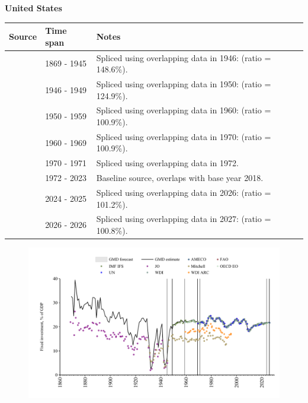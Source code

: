 \documentclass[12pt,a4paper,landscape]{article}
\begin{document}
\begin{adjustbox}{max totalsize={\paperwidth}{\paperheight},center}
\begin{minipage}[t][\textheight][t]{\textwidth}
\vspace*{0.5cm}
{}
\begin{center}
{\Large\bfseries United States}
\end{center}
\vspace{0.5cm}
\begin{table}[H]
\centering
\small
\begin{tabular}{|l|l|l|}
\hline
\textbf{Source} & \textbf{Time span} & \textbf{Notes} \\
\hline
\rowcolor{white}\cite{JO}& 1869 - 1945 &Spliced using overlapping data in 1946: (ratio = 148.6\%).\\
\rowcolor{lightgray}\cite{Mitchell}& 1946 - 1949 &Spliced using overlapping data in 1950: (ratio = 124.9\%).\\
\rowcolor{white}\cite{IMF_IFS}& 1950 - 1959 &Spliced using overlapping data in 1960: (ratio = 100.9\%).\\
\rowcolor{lightgray}\cite{OECD_EO}& 1960 - 1969 &Spliced using overlapping data in 1970: (ratio = 100.9\%).\\
\rowcolor{white}\cite{UN}& 1970 - 1971 &Spliced using overlapping data in 1972.\\
\rowcolor{lightgray}\cite{WDI}& 1972 - 2023 &Baseline source, overlaps with base year 2018.\\
\rowcolor{white}\cite{OECD_EO}& 2024 - 2025 &Spliced using overlapping data in 2026: (ratio = 101.2\%).\\
\rowcolor{lightgray}\cite{AMECO}& 2026 - 2026 &Spliced using overlapping data in 2027: (ratio = 100.8\%).\\
\hline
\end{tabular}
\end{table}
\begin{figure}[H]
\centering
\includegraphics[width=\textwidth,height=0.6\textheight,keepaspectratio]{graphs/USA_finv_GDP.pdf}
\end{figure}
\end{minipage}
\end{adjustbox}
\end{document}
